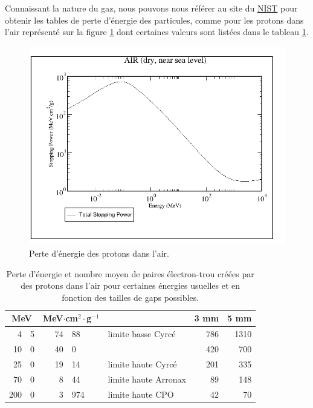 \documentclass[a4paper,11pt]{article}
\begin{document}
Connaissant la nature du gaz, nous pouvons nous référer au site du \href{https://physics.nist.gov/PhysRefData/Star/Text/PSTAR.html}{NIST} pour obtenir les tables de perte d'énergie des particules, comme pour les protons dans l'air représenté sur la figure \ref{fig:pAir} dont certaines valeurs sont listées dans le tableau \ref{tab:pAir}.

\begin{figure}
\includegraphics[width=\linewidth]{pAir.png} 
\caption{\label{fig:pAir}\footnotesize{Perte d'énergie des protons dans l'air.}}
\end{figure}

\begin{table}[h]
\begin{center}
\begin{tabular}{r@{.}lr@{.}ll|rr}
\multicolumn{2}{c}{MeV}&\multicolumn{2}{c}{MeV$\cdot$cm$^2\cdot$g$^{-1}$}&&3 mm&5 mm\\
\hline
\hline
4&5&\hspace*{3ex}74&88&limite basse Cyrcé&786&1310\\
10&0&40&0&&420&700\\
25&0&19&14&limite haute Cyrcé&201&335\\
70&0&8&44&limite haute Arronax&89&148\\
200&0&3&974&limite haute CPO&42&70\\
\hline
\end{tabular}
\caption{\label{tab:pAir}\footnotesize{Perte d'énergie et nombre moyen de paires électron-trou créées par des protons dans l'air pour certaines énergies usuelles et en fonction des tailles de gaps possibles.}}
\end{center}
\end{table}
\end{document}
